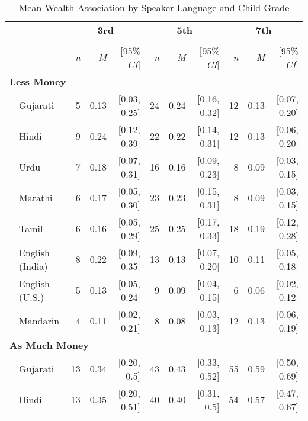 \begin{table}[H]
\centering
\caption{Mean Wealth Association by Speaker Language and Child Grade}\\
\begin{footnotesize}
\label{tab:wealth-means}
\begin{tabular}{p{.1in}lrrrrrrrrr}
\toprule
 &  & \multicolumn{3}{c}{\textbf{3rd}} & \multicolumn{3}{c}{\textbf{5th}} & \multicolumn{3}{c}{\textbf{7th}} \\
\cline{3-5} \cline{6-8} \cline{9-11}\\[-.75em]
&  & \textit{n} & \textit{M} & [95\% \textit{CI}] &  \textit{n} & \textit{M} & [95\% \textit{CI}] &  \textit{n}  & \textit{M} & [95\% \textit{CI}]\\
\midrule
\multicolumn{11}{l}{\textbf{Less Money}}\\
 & Gujarati & 5 & 0.13 & [0.03, 0.25] & 24 & 0.24 & [0.16, 0.32] & 12 & 0.13 & [0.07, 0.20]\\

 & Hindi & 9 & 0.24 & [0.12, 0.39] & 22 & 0.22 & [0.14, 0.31] & 12 & 0.13 & [0.06, 0.20]\\

 & Urdu & 7 & 0.18 & [0.07, 0.31] & 16 & 0.16 & [0.09, 0.23] & 8 & 0.09 & [0.03, 0.15]\\

 & Marathi & 6 & 0.17 & [0.05, 0.30] & 23 & 0.23 & [0.15, 0.31] & 8 & 0.09 & [0.03, 0.15]\\

 & Tamil & 6 & 0.16 & [0.05, 0.29] & 25 & 0.25 & [0.17, 0.33] & 18 & 0.19 & [0.12, 0.28]\\

 & English (India) & 8 & 0.22 & [0.09, 0.35] & 13 & 0.13 & [0.07, 0.20] & 10 & 0.11 & [0.05, 0.18]\\

 & English (U.S.) & 5 & 0.13 & [0.05, 0.24] & 9 & 0.09 & [0.04, 0.15] & 6 & 0.06 & [0.02, 0.12]\\

& Mandarin & 4 & 0.11 & [0.02, 0.21] & 8 & 0.08 & [0.03, 0.13] & 12 & 0.13 & [0.06, 0.19]\\
\midrule
\multicolumn{11}{l}{\textbf{As Much Money}}\\
 & Gujarati & 13 & 0.34 & [0.20, 0.5] & 43 & 0.43 & [0.33, 0.52] & 55 & 0.59 & [0.50, 0.69]\\

 & Hindi & 13 & 0.35 & [0.20, 0.51] & 40 & 0.40 & [0.31, 0.5] & 54 & 0.57 & [0.47, 0.67]\\


\end{tabular}
\end{footnotesize}
\end{table}
